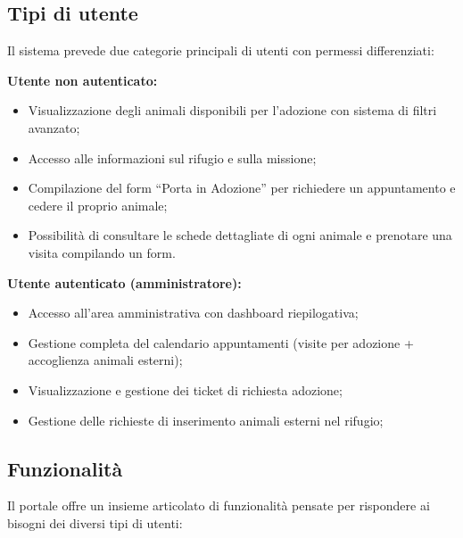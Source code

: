 \documentclass[a4paper,10pt]{article}
\begin{document}
    \subsection{Tipi di utente}
    Il sistema prevede due categorie principali di utenti con permessi differenziati:
    
    \vspace{1em}
    \textbf{Utente non autenticato:}
    \begin{itemize}
	   \item Visualizzazione degli animali disponibili per l'adozione con sistema di filtri avanzato;
	   \item Accesso alle informazioni sul rifugio e sulla missione;
	   \item Compilazione del form ``Porta in Adozione'' per richiedere un appuntamento e cedere il proprio animale;
	   \item Possibilità di consultare le schede dettagliate di ogni animale e prenotare una visita compilando un form.
    \end{itemize}

    \textbf{Utente autenticato (amministratore):}
    \begin{itemize}
	   \item Accesso all'area amministrativa con dashboard riepilogativa;
	   \item Gestione completa del calendario appuntamenti (visite per adozione + accoglienza animali esterni);
	   \item Visualizzazione e gestione dei ticket di richiesta adozione;
	   \item Gestione delle richieste di inserimento animali esterni nel rifugio;
    \end{itemize}

    \subsection{Funzionalità}
    Il portale offre un insieme articolato di funzionalità pensate per rispondere ai bisogni dei diversi tipi di utenti:
\end{document}
